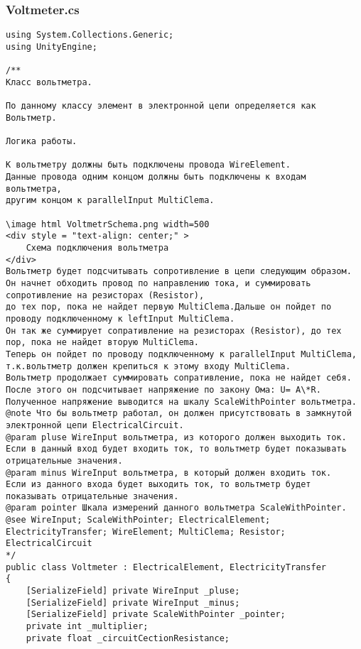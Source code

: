 \subsubsection*{Voltmeter.cs}
\begin{verbatim}
﻿using System.Collections.Generic;
using UnityEngine;

/**
Класс вольтметра.

По данному классу элемент в электронной цепи определяется как Вольтметр.

Логика работы.

К вольтметру должны быть подключены провода WireElement.
Данные провода одним концом должны быть подключены к входам вольтметра,
другим концом к parallelInput MultiClema.

\image html VoltmetrSchema.png width=500
<div style = "text-align: center;" >
    Схема подключения вольтметра
</div>
Вольтметр будет подсчитывать сопротивление в цепи следующим образом.
Он начнет обходить провод по направлению тока, и суммировать сопротивление на резисторах (Resistor),
до тех пор, пока не найдет первую MultiClema.Дальше он пойдет по проводу подключенному к leftInput MultiClema.
Он так же суммирует сопративление на резисторах (Resistor), до тех пор, пока не найдет вторую MultiClema.
Теперь он пойдет по проводу подключенному к parallelInput MultiClema, т.к.вольтметр должен крепиться к этому входу MultiClema.
Вольтметр продолжает суммировать сопративление, пока не найдет себя. После этого он подсчитывает напряжение по закону Ома: U= A\*R.
Полученное напряжение выводится на шкалу ScaleWithPointer вольтметра.
@note Что бы вольтметр работал, он должен присутствовать в замкнутой электронной цепи ElectricalCircuit.
@param pluse WireInput вольтметра, из которого должен выходить ток.
Если в данный вход будет входить ток, то вольтметр будет показывать отрицательные значения.
@param minus WireInput вольтметра, в который должен входить ток.
Если из данного входа будет выходить ток, то вольтметр будет показывать отрицательные значения.
@param pointer Шкала измерений данного вольтметра ScaleWithPointer.
@see WireInput; ScaleWithPointer; ElectricalElement; ElectricityTransfer; WireElement; MultiClema; Resistor; ElectricalCircuit
*/
public class Voltmeter : ElectricalElement, ElectricityTransfer
{
    [SerializeField] private WireInput _pluse;
    [SerializeField] private WireInput _minus;
    [SerializeField] private ScaleWithPointer _pointer;
    private int _multiplier;
    private float _circuitCectionResistance;


\end{verbatim}
